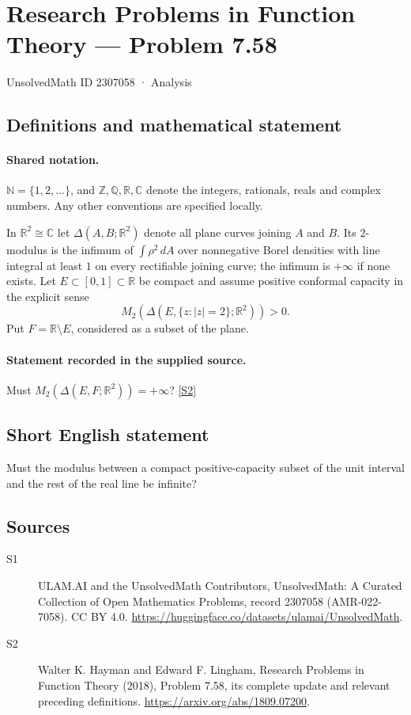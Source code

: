 \documentclass[11pt]{article}
\newcommand{\sref}[2]{\hyperlink{source:#1:#2}{[S#2]}}
\begin{document}
\setcounter{section}{2307057}
\section{Research Problems in Function Theory — Problem 7.58}\label{2307058}
{\small\sffamily UnsolvedMath ID 2307058 · Analysis}
\subsection{Definitions and mathematical statement}

\paragraph{Shared notation.}$\mathbb N=\{1,2,\ldots\}$, and $\mathbb Z,\mathbb Q,\mathbb R,\mathbb C$ denote the integers, rationals, reals and complex numbers. Any other conventions are specified locally.


In $\mathbb R^2\cong\mathbb C$ let $\Delta(A,B;\mathbb R^2)$ denote all plane curves joining $A$ and $B$. Its $2$-modulus is the infimum of $\int\rho^2\,dA$ over nonnegative Borel densities with line integral at least $1$ on every rectifiable joining curve; the infimum is $+\infty$ if none exists. Let $E\subset[0,1]\subset\mathbb R$ be compact and assume positive conformal capacity in the explicit sense
\[M_2(\Delta(E,\{z:|z|=2\};\mathbb R^2))>0.
\]
Put $F=\mathbb R\setminus E$, considered as a subset of the plane.
\paragraph{Statement recorded in the supplied source.}
Must $M_2(\Delta(E,F;\mathbb R^2))=+\infty$? \sref{2307058}{2}
\subsection{Short English statement}
Must the modulus between a compact positive-capacity subset of the unit interval and the rest of the real line be infinite?
\subsection{Sources}
\begin{description}
\item[\hypertarget{source:2307058:1}{S1}] ULAM.AI and the UnsolvedMath Contributors, UnsolvedMath: A Curated Collection of Open Mathematics Problems, record 2307058 (AMR-022-7058). CC BY 4.0. \url{https://huggingface.co/datasets/ulamai/UnsolvedMath}.
\item[\hypertarget{source:2307058:2}{S2}] Walter K. Hayman and Edward F. Lingham, Research Problems in Function Theory (2018), Problem 7.58, its complete update and relevant preceding definitions. \url{https://arxiv.org/abs/1809.07200}.
\end{description}
\label{end:2307058}
\end{document}
